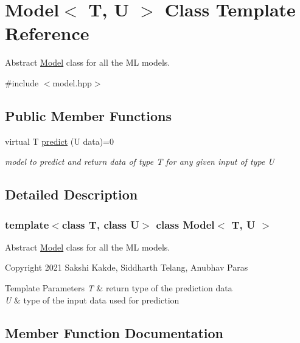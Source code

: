 \hypertarget{classModel}{}\section{Model$<$ T, U $>$ Class Template Reference}
\label{classModel}


Abstract \hyperlink{classModel}{Model} class for all the ML models.  




{\ttfamily \#include $<$model.\+hpp$>$}

\subsection*{Public Member Functions}
\begin{DoxyCompactItemize}
\item 
virtual T \hyperlink{classModel_aab70aeca992eb3a1ce09667e169b8743}{predict} (U data)=0
\begin{DoxyCompactList}\small\item\em model to predict and return data of type T for any given input of type U \end{DoxyCompactList}\end{DoxyCompactItemize}


\subsection{Detailed Description}
\subsubsection*{template$<$class T, class U$>$\newline
class Model$<$ T, U $>$}

Abstract \hyperlink{classModel}{Model} class for all the ML models. 

Copyright 2021 Sakshi Kakde, Siddharth Telang, Anubhav Paras 
\begin{DoxyTemplParams}{Template Parameters}
{\em T} & return type of the prediction data \\
\hline
{\em U} & type of the input data used for prediction \\
\hline
\end{DoxyTemplParams}


\subsection{Member Function Documentation}
\mbox{\label{classModel_aab70aeca992eb3a1ce09667e169b8743}} 
